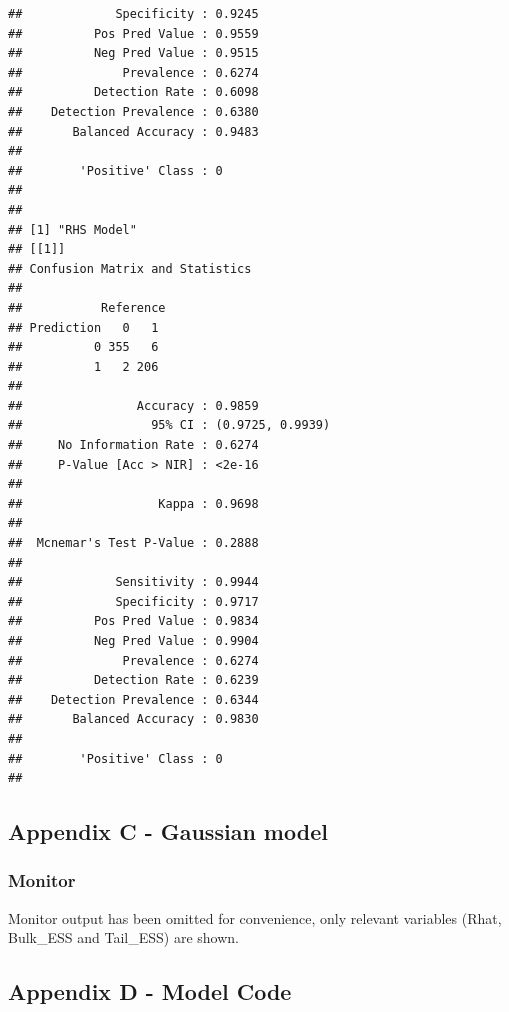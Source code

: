 \documentclass[
]{article}
\begin{document}
\begin{verbatim}
##             Specificity : 0.9245          
##          Pos Pred Value : 0.9559          
##          Neg Pred Value : 0.9515          
##              Prevalence : 0.6274          
##          Detection Rate : 0.6098          
##    Detection Prevalence : 0.6380          
##       Balanced Accuracy : 0.9483          
##                                           
##        'Positive' Class : 0               
##                                           
## 
## [1] "RHS Model"
## [[1]]
## Confusion Matrix and Statistics
## 
##           Reference
## Prediction   0   1
##          0 355   6
##          1   2 206
##                                           
##                Accuracy : 0.9859          
##                  95% CI : (0.9725, 0.9939)
##     No Information Rate : 0.6274          
##     P-Value [Acc > NIR] : <2e-16          
##                                           
##                   Kappa : 0.9698          
##                                           
##  Mcnemar's Test P-Value : 0.2888          
##                                           
##             Sensitivity : 0.9944          
##             Specificity : 0.9717          
##          Pos Pred Value : 0.9834          
##          Neg Pred Value : 0.9904          
##              Prevalence : 0.6274          
##          Detection Rate : 0.6239          
##    Detection Prevalence : 0.6344          
##       Balanced Accuracy : 0.9830          
##                                           
##        'Positive' Class : 0               
## 
\end{verbatim}

\hypertarget{apc}{%
\subsection{Appendix C - Gaussian model}\label{apc}}

\hypertarget{monitor-2}{%
\subsubsection{Monitor}\label{monitor-2}}

Monitor output has been omitted for convenience, only relevant variables
(Rhat, Bulk\_ESS and Tail\_ESS) are shown.

\hypertarget{apd}{%
\subsection{Appendix D - Model Code}\label{apd}}
\end{document}
